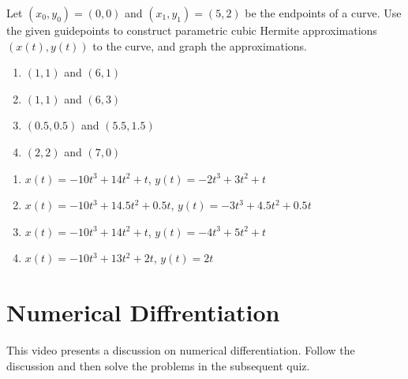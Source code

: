 \begin{myexercise}%
Let $\left(x_{0}, y_{0}\right)=(0,0)$ and $\left(x_{1}, y_{1}\right)=(5,2)$ be the endpoints of a curve. Use the given guidepoints to construct parametric cubic Hermite approximations $(x(t), y(t))$ to the curve, and graph the approximations.

\begin{enumerate}[label=(\alph*)]
\item $(1,1)$ and $(6,1)$
\item $(1,1)$ and $(6,3)$
\item $(0.5, 0.5)$ and $(5.5, 1.5)$
\item $(2,2)$ and $(7,0)$
\end{enumerate}
\begin{mysolution}
\begin{enumerate}[label=(\alph*)]
\item $x(t)=-10t^3+14t^2+t$, $y(t)=-2t^3+3t^2+t$
\item $x(t)=-10t^3+14.5t^2+0.5t$, $y(t)=-3t^3+4.5t^2+0.5t$
\item $x(t)=-10t^3+14t^2+t$, $y(t)=-4t^3+5t^2+t$
\item $x(t)=-10t^3+13t^2+2t$, $y(t)=2t$
\end{enumerate}
\end{mysolution}
\end{myexercise}

\section{Numerical Diffrentiation}

\begin{youtube}
This video presents a discussion on numerical differentiation. Follow the discussion and then solve the problems in the subsequent quiz.
\end{youtube}

